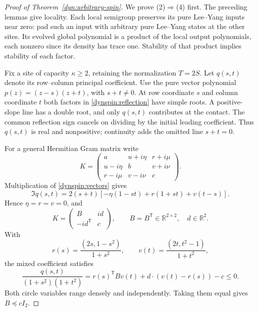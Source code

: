\documentclass[reqno]{amsart}
\theoremstyle{definition}
\theoremstyle{remark}
\newcommand{\R}{\mathbb R}
\begin{document}
\begin{proof}[Proof of Theorem~\ref{dyn:arbitrary-spin}]
We prove (2)$\Rightarrow$(4) first.  The preceding lemmas give locality.
Each local semigroup preserves its pure Lee--Yang inputs near zero:
pad such an input with arbitrary pure Lee--Yang states at the other
sites.  Its evolved global polynomial is a product of the local output
polynomials, each nonzero since its density has trace one.  Stability
of that product implies stability of each factor.

Fix a site of capacity $\kappa\geq2$, retaining the normalization
$T=2S$.  Let $q(s,t)$ denote its row--column principal coefficient.
Use the pure vector polynomial $p(z)=(z-s)(z+t)$, with $s+t\ne0$.
At row coordinate $s$ and column coordinate $t$ both factors in
\eqref{dynspin:reflection} have simple roots.  A positive-slope line
has a double root, and only $q(s,t)$ contributes at the contact.
The common reflection sign cancels on dividing by the initial leading
coefficient.  Thus $q(s,t)$ is real and nonpositive; continuity adds
the omitted line $s+t=0$.

For a general Hermitian Gram matrix write
\[
 K=\begin{pmatrix}
 a&u+i\eta&r+i\mu\\
 u-i\eta&b&v+i\nu\\
 r-i\mu&v-i\nu&c
 \end{pmatrix}.
\]
Multiplication of \eqref{dynspin:vectors} gives
\[
 \Im q(s,t)=2(s+t)[-\eta(1-st)+r(1+st)+v(t-s)].
\]
Hence $\eta=r=v=0$, and
\begin{equation}\label{dynspin:local-shape}
 K=\begin{pmatrix}B&i d\\-i d^{\mathsf T}&c\end{pmatrix},
 \qquad B=B^{\mathsf T}\in\R^{2\times2},\quad d\in\R^2.
\end{equation}
With
\[
 r(s)=\frac{(2s,1-s^2)}{1+s^2},\qquad
 v(t)=\frac{(2t,t^2-1)}{1+t^2},
\]
the mixed coefficient satisfies
\begin{equation}\label{dynspin:circle}
 \frac{q(s,t)}{(1+s^2)(1+t^2)}
 =r(s)^{\mathsf T}Bv(t)+d\cdot(v(t)-r(s))-c\leq0.
\end{equation}
Both circle variables range densely and independently.  Taking them
equal gives $B\preceq cI_2$.


\end{proof}
\end{document}
